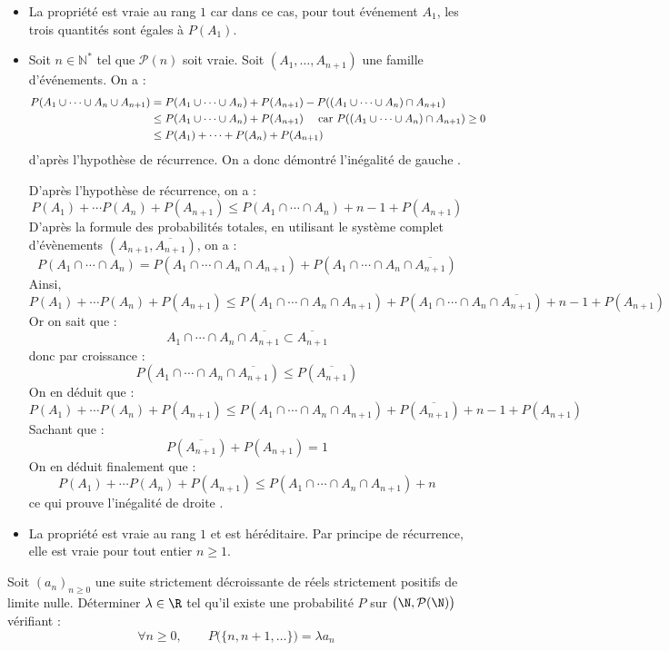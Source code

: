 \documentclass[a4paper,twoside,french,10pt]{VcCours}
\begin{document}
\begin{itemize}
\item La propriété est vraie au rang $1$ car dans ce cas, pour tout événement $A_1$, les trois quantités sont égales à $P(A_1)$.
\item Soit $n \in \mathbb{N}^*$ tel que $\mathcal{P}(n)$ soit vraie. Soit $(A_1, \ldots, A_{n+1})$ une famille d'événements. On a :
\begin{align*}
P(A_1 \cup \cdots \cup A_n \cup A_{n+1}) & = P(A_1 \cup \cdots  \cup A_{n}) + P(A_{n+1}) - P((A_1 \cup \cdots \cup A_n) \cap A_{n+1}) \\
& \leq P(A_1 \cup \cdots  \cup A_{n}) + P(A_{n+1}) \quad \hbox{ car } P((A_1 \cup \cdots \cup A_n) \cap A_{n+1}) \geq 0 \\
& \leq P(A_1) + \cdots + P(A_n) + P(A_{n+1})
\end{align*}
d'après l'hypothèse de récurrence. On a donc démontré l'inégalité \og de gauche \fg.



\noindent D'après l'hypothèse de récurrence, on a :
$$  P(A_1) + \cdots P(A_n) + P(A_{n+1}) \leq P(A_1 \cap \cdots \cap A_n) + n-1  + P(A_{n+1})$$
D'après la formule des probabilités totales, en utilisant le système complet d'évènements $(A_{n+1}, \overline{A_{n+1}})$, on a :
$$ P(A_1 \cap \cdots \cap A_n) = P(A_1 \cap \cdots \cap A_n \cap A_{n+1}) + P(A_1 \cap \cdots \cap A_n \cap \overline{A_{n+1}})$$
Ainsi,
$$ P(A_1) + \cdots P(A_n) + P(A_{n+1}) \leq P(A_1 \cap \cdots \cap A_n \cap A_{n+1}) + P(A_1 \cap \cdots \cap A_n \cap \overline{A_{n+1}}) + n-1  + P(A_{n+1})$$
Or on sait que :
$$ A_1 \cap \cdots \cap A_n \cap \overline{A_{n+1}} \subset \overline{A_{n+1}}$$
donc par croissance :
$$ P(A_1 \cap \cdots \cap A_n \cap \overline{A_{n+1}}) \leq P(\overline{A_{n+1}})$$
On en déduit que : 
$$ P(A_1) + \cdots P(A_n) + P(A_{n+1}) \leq P(A_1 \cap \cdots \cap A_n \cap A_{n+1}) + P(\overline{A_{n+1}}) + n-1  + P(A_{n+1})$$
Sachant que :
$$ P(\overline{A_{n+1}}) + P(A_{n+1})=1$$
On en déduit finalement que :
$$  P(A_1) + \cdots P(A_n) + P(A_{n+1}) \leq P(A_1 \cap \cdots \cap A_n \cap A_{n+1}) +n $$
ce qui prouve l'inégalité \og de droite \fg.
\item La propriété est vraie au rang $1$ et est héréditaire. Par principe de récurrence, elle est vraie pour tout entier $n \geq 1$.
\end{itemize}


\begin{Exercice}{} Soit $(a_n)_{n \geq 0}$ une suite strictement décroissante de réels strictement positifs de limite nulle.  Déterminer $\lambda \in \R$ tel qu'il existe une probabilité $P$ sur $\bigl(\N,\mathcal{P}(\N)\bigr)$ vérifiant :
    \[
    \forall n \geq 0, \qquad P\bigl( \lbrace n, n+1, \ldots \rbrace) = \lambda a_n
    \]
\end{Exercice} 
\end{document}
